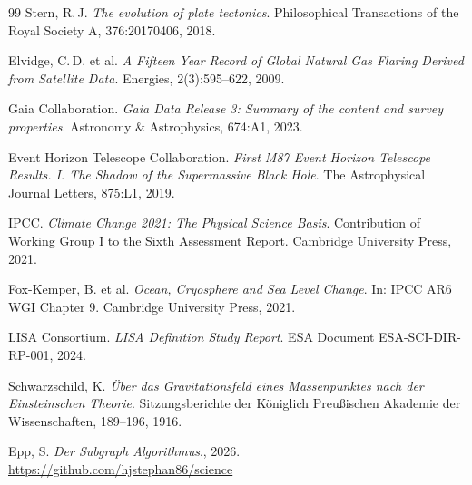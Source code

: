 ﻿\documentclass[a4paper,12pt]{article}
\theoremstyle{definition}
\begin{document}
\begin{thebibliography}{99}
Stern, R.\,J.
\textit{The evolution of plate tectonics}.
Philosophical Transactions of the Royal Society A, 376:20170406, 2018.

Elvidge, C.\,D. et al.
\textit{A Fifteen Year Record of Global Natural Gas Flaring Derived from
Satellite Data}.
Energies, 2(3):595--622, 2009.

Gaia Collaboration.
\textit{Gaia Data Release 3: Summary of the content and survey properties}.
Astronomy \& Astrophysics, 674:A1, 2023.

Event Horizon Telescope Collaboration.
\textit{First M87 Event Horizon Telescope Results. I. The Shadow of the
Supermassive Black Hole}.
The Astrophysical Journal Letters, 875:L1, 2019.

IPCC.
\textit{Climate Change 2021: The Physical Science Basis}.
Contribution of Working Group I to the Sixth Assessment Report.
Cambridge University Press, 2021.

Fox-Kemper, B. et al.
\textit{Ocean, Cryosphere and Sea Level Change}.
In: IPCC AR6 WGI Chapter 9. Cambridge University Press, 2021.

LISA Consortium.
\textit{LISA Definition Study Report}.
ESA Document ESA-SCI-DIR-RP-001, 2024.

Schwarzschild, K.
\textit{Über das Gravitationsfeld eines Massenpunktes nach der
Einsteinschen Theorie}.
Sitzungsberichte der Königlich Preußischen Akademie der Wissenschaften,
189--196, 1916.

Epp, S.
\textit{Der Subgraph Algorithmus}., 2026.
\url{https://github.com/hjstephan86/science}

\end{thebibliography}
\end{document}
